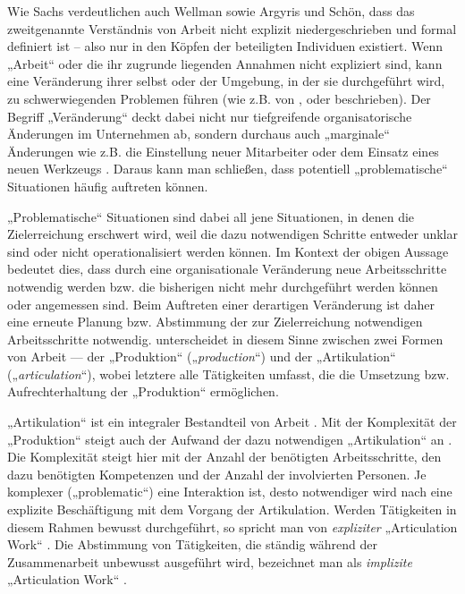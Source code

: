 Wie Sachs verdeutlichen auch Wellman sowie Argyris und Schön, dass das zweitgenannte Verständnis von Arbeit nicht explizit niedergeschrieben und formal definiert ist -- also nur in den Köpfen der beteiligten Individuen existiert. Wenn „Arbeit“ oder die ihr zugrunde liegenden Annahmen nicht expliziert sind, kann eine Veränderung ihrer selbst oder der Umgebung, in der sie durchgeführt wird, zu schwerwiegenden Problemen führen (wie z.B. von \citet{Nonaka95}, \citet{Krogh00} oder \citet{Gerson86} beschrieben). Der Begriff „Veränderung“ deckt dabei nicht nur tiefgreifende organisatorische Änderungen im Unternehmen ab, sondern durchaus auch „marginale“ Änderungen wie z.B. die Einstellung neuer Mitarbeiter oder dem Einsatz eines neuen Werkzeugs \citep{Olesen03}. Daraus kann man schließen, dass potentiell „problematische“ Situationen häufig auftreten können. 

„Problematische“ Situationen sind dabei all jene Situationen, in denen die Zielerreichung erschwert wird, weil die dazu notwendigen Schritte entweder unklar sind oder nicht operationalisiert werden können. Im Kontext der obigen Aussage bedeutet dies, dass durch eine organisationale Veränderung neue Arbeitsschritte notwendig werden bzw. die bisherigen nicht mehr durchgeführt werden können oder angemessen sind. Beim Auftreten einer derartigen Veränderung ist daher eine erneute Planung bzw. Abstimmung der zur Zielerreichung notwendigen Arbeitsschritte notwendig. \citet{Fujimura87} unterscheidet in diesem Sinne zwischen zwei Formen von Arbeit — der „Produktion“ („\emph{production}“) und der „Artikulation“ („\emph{articulation}“), wobei letztere alle Tätigkeiten umfasst, die die Umsetzung bzw. Aufrechterhaltung der „Produktion“ ermöglichen.

„Artikulation“ ist ein integraler Bestandteil von Arbeit \citep{Strauss85}. Mit der Komplexität der „Produktion“ steigt auch der Aufwand der dazu notwendigen „Artikulation“ an \citep{Strauss88}. Die Komplexität steigt hier mit der Anzahl der benötigten Arbeitsschritte, den dazu benötigten Kompetenzen und der Anzahl der involvierten Personen. Je komplexer („problematic“) eine Interaktion ist, desto notwendiger wird nach \citep{Strauss88} eine explizite Beschäftigung mit dem Vorgang der Artikulation. Werden Tätigkeiten in diesem Rahmen bewusst durchgeführt, so spricht man von \emph{expliziter} „Articulation Work“ \citep{Strauss88} \citep{Fjuk97}. Die Abstimmung von Tätigkeiten, die ständig während der Zusammenarbeit unbewusst ausgeführt wird, bezeichnet man als \emph{implizite} „Articulation Work“ \citep{Fjuk97}. 


